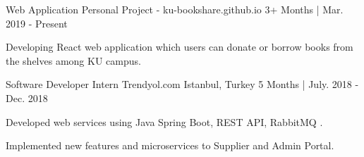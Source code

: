 
\begin{cventries}
  \cventry
  {Web Application}
  {Personal Project - ku-bookshare.github.io} %
    {} %
    {3+ Months | Mar. 2019 - Present} %
    {
      \begin{cvitems} %
      	\item {Developing React web application which users can donate or borrow books from the shelves among KU campus. } 
      \end{cvitems}
    }

  \cventry
   {Software Developer Intern} %
    {Trendyol.com} %
    {Istanbul, Turkey} %
    {5 Months | July. 2018 - Dec. 2018} %
    {
      \begin{cvitems} %
		    \item {Developed web services using Java Spring Boot, REST API, RabbitMQ .}
        \item {Implemented new features and microservices to Supplier and Admin Portal.}
      \end{cvitems}
    }


\end{cventries}
